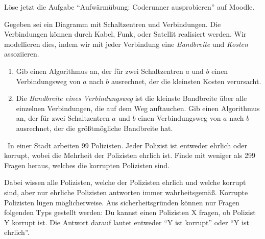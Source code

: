 \documentclass{uebung_cs}
\begin{document}
\begin{aufgabe}
    Löse jetzt die Aufgabe \enquote{Aufwärmübung: Coderunner ausprobieren} auf Moodle.
\end{aufgabe}


\begin{aufgabe}[Telefonnetzwerk]
    Gegeben sei ein Diagramm mit Schaltzentren und Verbindungen.
    Die Verbindungen können durch Kabel, Funk, oder Satellit realisiert werden.
    Wir modellieren dies, indem wir mit jeder Verbindung eine \emph{Bandbreite} und \emph{Kosten} assoziieren.
    \begin{enumerate}
        \item Gib einen Algorithmus an, der für zwei Schaltzentren $a$ und $b$ einen Verbindungsweg von $a$ nach $b$ ausrechnet, der die kleinsten Kosten verursacht.
        \item Die \emph{Bandbreite eines Verbindungsweg} ist die kleinste Bandbreite über alle einzelnen Verbindungen, die auf dem Weg auftauchen.
        Gib einen Algorithmus an, der für zwei Schaltzentren $a$ und $b$ einen Verbindungsweg von $a$ nach $b$ ausrechnet, der die größtmögliche Bandbreite hat.
    \end{enumerate}
\end{aufgabe}

\begin{aufgabe}\
  In einer Stadt arbeiten 99 Polizisten.
  Jeder Polizist ist entweder ehrlich oder korrupt, wobei die Mehrheit der Polizisten ehrlich ist.
  Finde mit weniger als 299 Fragen heraus, welches die korrupten Polizisten sind.
  
  Dabei wissen alle Polizisten, welche der Polizisten ehrlich und welche korrupt sind, aber nur ehrliche Polizisten antworten immer wahrheitsgemäß.
  Korrupte Polizisten lügen möglicherweise.
  Aus sicherheitsgründen können nur Fragen folgenden Typs gestellt werden: Du kannst einen Polizisten X fragen, ob Polizist Y korrupt ist.
  Die Antwort darauf lautet entweder \enquote{Y ist korrupt} oder \enquote{Y ist ehrlich}.

\end{aufgabe}
\end{document}
